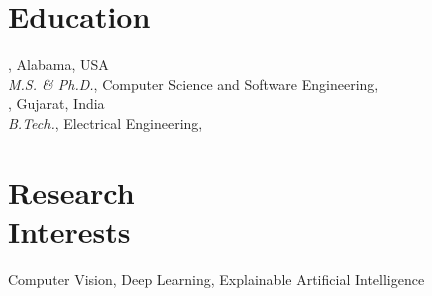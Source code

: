 \documentclass[mm]{simple_style}
\begin{document}
\begin{resume}

\iffalse
\vspace{-1ex}
\section{Biography}
\cusemph{Indian Institute of Technology Gandhinagar}, Gujarat, India\\
{\sl B.Tech.}, Electrical Engineering, \timeline{Jul' 12 - May' 16}
\\
\cusemph{GPA: 8.55/10}
\\[1ex]
\sectionline
\fi

\vspace{-1ex}
\section{Education}
, Alabama, USA \\
{\sl M.S. \& Ph.D.}, Computer Science and Software Engineering, {} 
\\[2ex] 
, Gujarat, India \\
{\sl B.Tech.}, Electrical Engineering, 
\\[1ex]
\sectionline

\vspace{-1ex}
\section{Research\\Interests}
\par
Computer Vision, Deep Learning, Explainable Artificial Intelligence


\end{resume}
\end{document}
